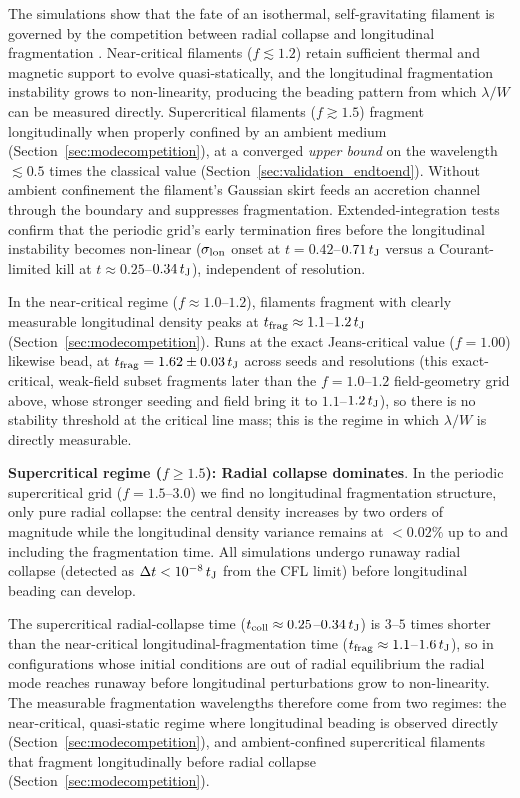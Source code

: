 \documentclass[usenatbib,twoside,twocolumn]{mnras}
\begin{document}
The simulations show that the fate of an isothermal, self-gravitating filament is governed by the competition between radial collapse and longitudinal fragmentation \citep{Inutsuka1997, Pon2012}. Near-critical filaments ($f\lesssim1.2$) retain sufficient thermal and magnetic support to evolve quasi-statically, and the longitudinal fragmentation instability grows to non-linearity, producing the beading pattern from which $\lambda/W$ can be measured directly. Supercritical filaments ($f\gtrsim1.5$) fragment longitudinally when properly confined by an ambient medium (Section~\ref{sec:modecompetition}), at a converged \emph{upper bound} on the wavelength $\lesssim0.5$ times the classical value (Section~\ref{sec:validation_endtoend}). Without ambient confinement the filament's Gaussian skirt feeds an accretion channel through the boundary and suppresses fragmentation. Extended-integration tests confirm that the periodic grid's early termination fires before the longitudinal instability becomes non-linear ($\sigma_{\rm lon}$ onset at $t=0.42$--$0.71\,t_{\rm J}$ versus a Courant-limited kill at $t\approx0.25$--$0.34\,t_{\rm J}$), independent of resolution.

In the near-critical regime ($f\approx1.0$--$1.2$), filaments fragment with clearly measurable longitudinal density peaks at $t_{\rm frag}\approx1.1$--$1.2\,t_{\rm J}$ (Section~\ref{sec:modecompetition}). Runs at the exact Jeans-critical value ($f=1.00$) likewise bead, at $t_{\rm frag}=1.62\pm0.03\,t_{\rm J}$ across seeds and resolutions (this exact-critical, weak-field subset fragments later than the $f=1.0$--$1.2$ field-geometry grid above, whose stronger seeding and field bring it to $1.1$--$1.2\,t_{\rm J}$), so there is no stability threshold at the critical line mass; this is the regime in which $\lambda/W$ is directly measurable.

\textbf{Supercritical regime ($f \geq 1.5$): Radial collapse dominates}. In the periodic supercritical grid ($f=1.5$--$3.0$) we find no longitudinal fragmentation structure, only pure radial collapse: the central density increases by two orders of magnitude while the longitudinal density variance remains at $<0.02\%$ up to and including the fragmentation time. All simulations undergo runaway radial collapse (detected as $\Delta t < 10^{-8}\,t_{\rm J}$ from the CFL limit) before longitudinal beading can develop.

The supercritical radial-collapse time ($t_{\rm coll}\approx0.25$--$0.34\,t_{\rm J}$) is $3$--$5$ times shorter than the near-critical longitudinal-fragmentation time ($t_{\rm frag}\approx1.1$--$1.6\,t_{\rm J}$), so in configurations whose initial conditions are out of radial equilibrium the radial mode reaches runaway before longitudinal perturbations grow to non-linearity. The measurable fragmentation wavelengths therefore come from two regimes: the near-critical, quasi-static regime where longitudinal beading is observed directly (Section~\ref{sec:modecompetition}), and ambient-confined supercritical filaments that fragment longitudinally before radial collapse (Section~\ref{sec:modecompetition}).
\end{document}
